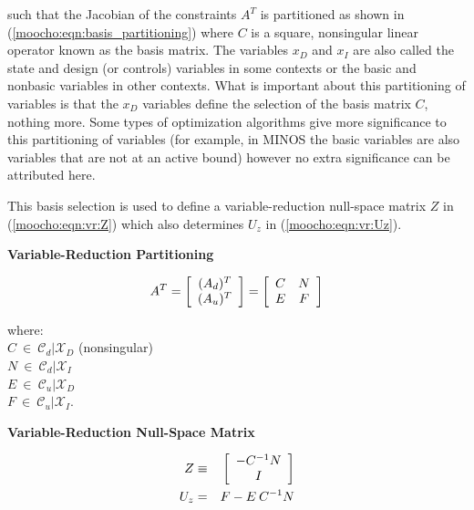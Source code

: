 \documentclass[pdf,12pt,report]{SANDreport}
\begin{document}
\noindent{}such that the Jacobian of the constraints $A^T$ is partitioned as
shown in (\ref{moocho:eqn:basis_partitioning}) where $C$ is a square,
nonsingular linear operator known as the basis matrix.  The variables $x_D$
and $x_I$ are also called the state and design (or controls) variables
{}\cite{GBiros_OGhattas_1999a} in some contexts or the basic and nonbasic
variables {}\cite{ref:murtagh_minos_1995} in other contexts.  What is
important about this partitioning of variables is that the $x_D$ variables
define the selection of the basis matrix $C$, nothing more.  Some types of
optimization algorithms give more significance to this partitioning of
variables (for example, in MINOS {}\cite{ref:murtagh_minos_1995} the basic
variables are also variables that are not at an active bound) however no extra
significance can be attributed here.

This basis selection is used to define a variable-reduction null-space matrix
$Z$ in (\ref{moocho:eqn:vr:Z}) which also determines $U_z$ in
(\ref{moocho:eqn:vr:Uz}).

{\bsinglespace
\begin{center}\textbf{Variable-Reduction Partitioning}\end{center}
\begin{equation}
A^T =
{\bmat{c}
(A_d)^T \\
(A_u)^T
\emat}
=
{\bmat{cc}
C & N \\
E & F
\emat}
\label{moocho:eqn:basis_partitioning}
\end{equation} 
\begin{tabbing}
\hspace{4ex}where:\hspace{5ex}\= \\
\>	$C \:\in\:\mathcal{C}_d|\mathcal{X}_D$ \hspace{4ex} (nonsingular)\\
\>	$N \:\in\:\mathcal{C}_d|\mathcal{X}_I$ \\
\>	$E \:\in\:\mathcal{C}_u|\mathcal{X}_D$ \\
\>	$F \:\in\:\mathcal{C}_u|\mathcal{X}_I$.
\end{tabbing}

\begin{center}\textbf{Variable-Reduction Null-Space Matrix}\end{center}
\begin{eqnarray}
Z & \equiv & {\bmat{c} - C^{-1} N \\ I \emat}       \label{moocho:eqn:vr:Z}  \\
U_z & = & F - E \: C^{-1} N                         \label{moocho:eqn:vr:Uz} 
\end{eqnarray}
\esinglespace}
\end{document}
